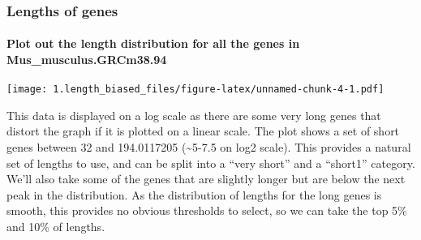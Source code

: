 \documentclass[]{article}
\newenvironment{Shaded}{\begin{snugshade}}{\end{snugshade}}
\newcommand{\KeywordTok}[1]{\textcolor[rgb]{0.13,0.29,0.53}{\textbf{#1}}}
\newcommand{\DataTypeTok}[1]{\textcolor[rgb]{0.13,0.29,0.53}{#1}}
\newcommand{\DecValTok}[1]{\textcolor[rgb]{0.00,0.00,0.81}{#1}}
\newcommand{\FloatTok}[1]{\textcolor[rgb]{0.00,0.00,0.81}{#1}}
\newcommand{\StringTok}[1]{\textcolor[rgb]{0.31,0.60,0.02}{#1}}
\newcommand{\OperatorTok}[1]{\textcolor[rgb]{0.81,0.36,0.00}{\textbf{#1}}}
\newcommand{\NormalTok}[1]{#1}
\let\oldparagraph\paragraph
\renewcommand{\paragraph}[1]{\oldparagraph{#1}\mbox{}}
\begin{document}
\subsubsection{Lengths of genes}\label{lengths-of-genes}

\paragraph{Plot out the length distribution for all the genes in
Mus\_musculus.GRCm38.94}\label{plot-out-the-length-distribution-for-all-the-genes-in-mus_musculus.grcm38.94}

\begin{Shaded}
\end{Shaded}

\texttt{[image: 1.length\_biased\_files/figure-latex/unnamed-chunk-4-1.pdf]}

This data is displayed on a log scale as there are some very long genes
that distort the graph if it is plotted on a linear scale. The plot
shows a set of short genes between 32 and 194.0117205
(\textasciitilde{}5-7.5 on log2 scale). This provides a natural set of
lengths to use, and can be split into a ``very short'' and a ``short1''
category. We'll also take some of the genes that are slightly longer but
are below the next peak in the distribution. As the distribution of
lengths for the long genes is smooth, this provides no obvious
thresholds to select, so we can take the top 5\% and 10\% of lengths.

\begin{Shaded}
\end{Shaded}
\end{document}
